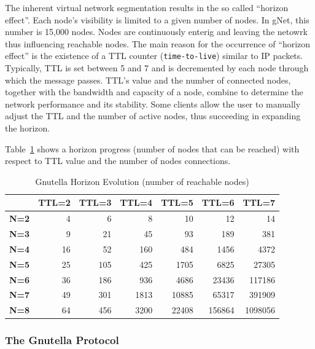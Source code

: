 The inherent virtual network segmentation results in the so called ``horizon
effect''. Each node's visibility is limited to a given number of nodes. In
gNet, this number is 15,000 nodes. Nodes are continuously enterig and leaving
the netowrk thus influencing reachable nodes. The main reason for the
occurrence of ``horizon effect'' is the existence of a TTL counter
(\texttt{time-to-live}) similar to IP packets. Typically, TTL is set between 5
and 7 and is decremented by each node through which the message passes. TTL's
value and the number of connected nodes, together with the bandwidth and
capacity of a node, combine to determine the network performance and its
stability. Some clients allow the user to manually adjust the TTL and the
number of active nodes, thus succeeding in expanding the horizon.

Table~\ref{tab:p2p-systems:gnutella-horizon} shows a horizon progress
(number of nodes that can be reached) with respect to TTL value and the number
of nodes connections.

\begin{table}[htb]
  \centering
  \caption{Gnutella Horizon Evolution (number of reachable nodes)}
  \label{tab:p2p-systems:gnutella-horizon}
  \begin{tabular}{@{}lrrrrrr@{}}
    \toprule
      & \textbf{TTL=2} & \textbf{TTL=3} & \textbf{TTL=4} & \textbf{TTL=5} &
      \textbf{TTL=6} & \textbf{TTL=7} \\
    \midrule
      \textbf{N=2} & 4 & 6 & 8 & 10 & 12 & 14 \\
      \textbf{N=3} & 9 & 21 & 45 & 93 & 189 & 381 \\
      \textbf{N=4} & 16 & 52 & 160 & 484 & 1456 & 4372 \\
      \textbf{N=5} & 25 & 105 & 425 & 1705 & 6825 & 27305 \\
      \textbf{N=6} & 36 & 186 & 936 & 4686 & 23436 & 117186 \\
      \textbf{N=7} & 49 & 301 & 1813 & 10885 & 65317 & 391909 \\
      \textbf{N=8} & 64 & 456 & 3200 & 22408 & 156864 & 1098056 \\
    \bottomrule
  \end{tabular}
\end{table}

\subsubsection{The Gnutella Protocol}

